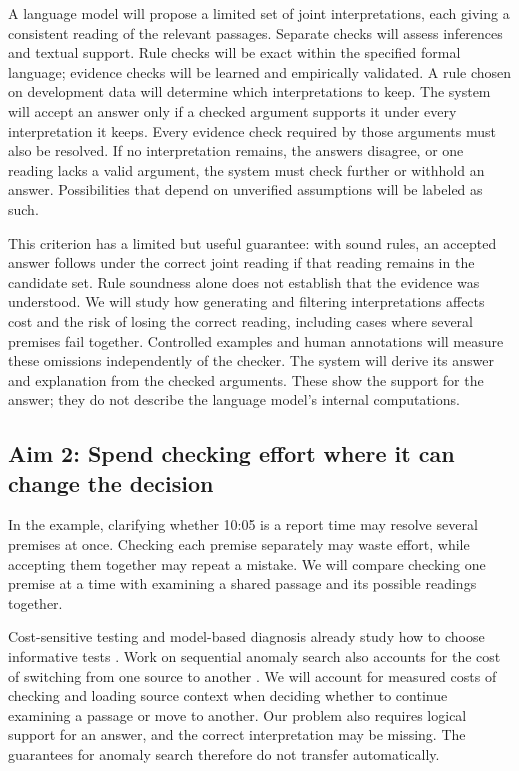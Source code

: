 \documentclass[12pt]{article}
\begin{document}
A language model will propose a limited set of joint interpretations, each giving a consistent reading of the relevant passages. Separate checks will assess inferences and textual support. Rule checks will be exact within the specified formal language; evidence checks will be learned and empirically validated. A rule chosen on development data will determine which interpretations to keep. The system will accept an answer only if a checked argument supports it under every interpretation it keeps. Every evidence check required by those arguments must also be resolved. If no interpretation remains, the answers disagree, or one reading lacks a valid argument, the system must check further or withhold an answer. Possibilities that depend on unverified assumptions will be labeled as such.

This criterion has a limited but useful guarantee: with sound rules, an accepted answer follows under the correct joint reading if that reading remains in the candidate set. Rule soundness alone does not establish that the evidence was understood. We will study how generating and filtering interpretations affects cost and the risk of losing the correct reading, including cases where several premises fail together. Controlled examples and human annotations will measure these omissions independently of the checker. The system will derive its answer and explanation from the checked arguments. These show the support for the answer; they do not describe the language model's internal computations.

\subsection*{Aim 2: Spend checking effort where it can change the decision}

In the example, clarifying whether 10:05 is a report time may resolve several premises at once. Checking each premise separately may waste effort, while accepting them together may repeat a mistake. We will compare checking one premise at a time with examining a shared passage and its possible readings together.

Cost-sensitive testing and model-based diagnosis already study how to choose informative tests \citep{greiner2006testing,dekleer1987diagnosis}. Work on sequential anomaly search also accounts for the cost of switching from one source to another \citep{ubl2023anomaly}. We will account for measured costs of checking and loading source context when deciding whether to continue examining a passage or move to another. Our problem also requires logical support for an answer, and the correct interpretation may be missing. The guarantees for anomaly search therefore do not transfer automatically.
\end{document}
